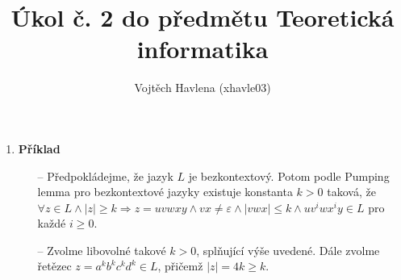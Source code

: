 \documentclass[a4paper,12pt]{article}
\title{Úkol č. 2 do předmětu Teoretická informatika}
\author{Vojtěch Havlena (xhavle03)}
\date{}
\begin{document}
\maketitle


\begin{enumerate}[label=\textbf{\arabic*}.]
 \item {\bfseries Příklad}
  \begin{itemize}
   \item[--] Předpokládejme, že jazyk $L$ je bezkontextový. Potom podle Pumping lemma pro bezkontextové jazyky 
    existuje konstanta $k > 0$ taková, že $\forall z\in L \wedge |z| \geq k \Rightarrow z = uvwxy \wedge 
    vx\neq\varepsilon \wedge |vwx| \leq k \wedge uv^iwx^iy\in L$ pro každé $i \geq 0$.
    
   \item[--] Zvolme libovolné takové $k > 0$, splňující výše uvedené. Dále zvolme řetězec $z = a^kb^kc^kd^k \in L$, přičemž
    $|z| = 4k \geq k$.
    

\end{itemize}
\end{enumerate}
\end{document}
